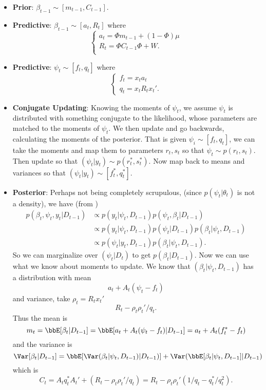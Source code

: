\documentclass{article}
\begin{document}
\begin{itemize}

\item \textbf{Prior}: $\beta_{t-1} \sim [m_{t-1}, C_{t-1}]$.

\item \textbf{Predictive}: $\beta_{t-1} \sim [a_t, R_t]$ where
\[
\begin{cases}
a_t = \Phi m_{t-1} + (1 - \Phi) \mu \\
R_t = \Phi C_{t-1} \Phi + W. \\
\end{cases}
\]

\item \textbf{Predictive}: $\psi_t \sim [f_t, q_t]$ where
\[
\begin{cases}
f_t = x_t a_t \\
q_t = x_t R_t x_t'.
\end{cases}
\]

\item \textbf{Conjugate Updating}: Knowing the moments of $\psi_t$, we assume
  $\psi_t$ is distributed with something conjugate to the likelihood, whose
  parameters are matched to the moments of $\psi_t$.  We then update and go
  backwards, calculating the moments of the posterior.  That is given $\psi_i
  \sim [f_t, q_t]$, we can take the moments and map them to parameters $r_t,
  s_t$ so that $\psi_t \sim p(r_t, s_t)$.  Then update so that $(\psi_t | y_t)
  \sim p(r_t^*, s_t^*)$.  Now map back to means and variances so that $(\psi_t |
  y_t) \sim [f_t^*, q_t^*]$.

\item \textbf{Posterior}: Perhaps not being completely scrupulous, (since $p(\psi_t | \theta_t)$ 
  is not a density), we have (from \cite{west-etal-1985})
  \begin{align*}
    p(\beta_t, \psi_t, y_t | D_{t-1}) 
    & \propto p(y_t | \psi_t, D_{t-1}) p(\psi_t, \beta_t | D_{t-1}) \\
    & \propto p(y_t | \psi_t, D_{t-1}) p(\psi_t | D_{t-1}) p(\beta_t | \psi_t,
    D_{t-1}) \\
    & \propto p(\psi_t | y_t, D_{t-1}) p(\beta_t | \psi_t, D_{t-1}).
  \end{align*}
  So we can marginalize over $(\psi_t | D_t)$ to get $p(\beta_t | D_{t-1})$.
  Now we can use what we know about moments to update.  We know that $(\beta_t |
  \psi_t, D_{t-1})$ has a distribution with mean
  \[
  a_t + A_t (\psi_t - f_t)
  \]
  and variance, take $\rho_t = R_t x_t'$
  \[
  R_t - \rho_t \rho_t' / q_t.
  \]
  Thus the mean is
  \[
  m_t = \bbE[\beta_t | D_{t-1}] = \bbE[ a_t + A_t (\psi_t - f_t) | D_{t-1}] = a_t + A_t (f_t^* - f_t)
  \]
  and the variance is
  \[
  \Var[\beta_t | D_{t-1}] = \bbE[ \Var(\beta_t | \psi_t, D_{t-1}) | D_{t-1}) ] +
  \Var( \bbE[\beta_t | \psi_t, D_{t-1}] | D_{t-1})
  \]
  which is
  \[
  C_t = A_t q_t^* A_t' + (R_t - \rho_t \rho_t' / q_t) = R_t - \rho_t \rho_t' (1/q_t -
  q_t^* / q_t^2).
  \]

\end{itemize}
\end{document}
